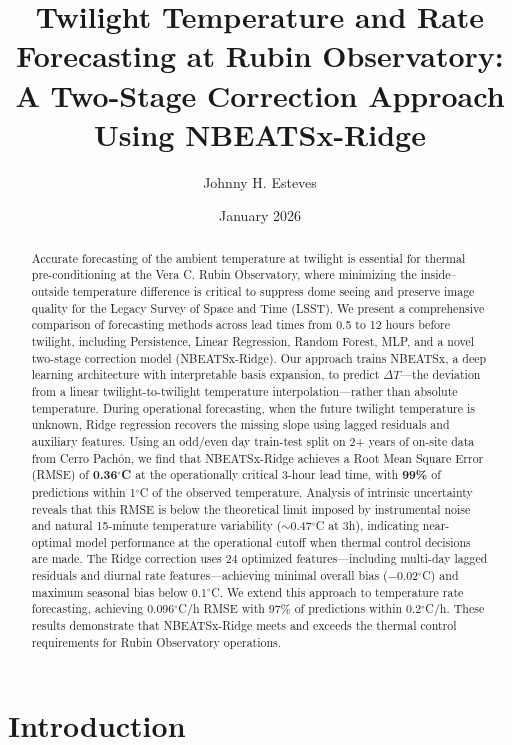 \documentclass[11pt]{article}
\title{Twilight Temperature and Rate Forecasting at Rubin Observatory:\\
A Two-Stage Correction Approach Using NBEATSx-Ridge}
\author{Johnny H. Esteves}
\date{January 2026}
\begin{document}
\maketitle

\begin{abstract}
Accurate forecasting of the ambient temperature at twilight is essential for thermal pre-conditioning at the Vera C. Rubin Observatory, where minimizing the inside--outside temperature difference is critical to suppress dome seeing and preserve image quality for the Legacy Survey of Space and Time (LSST). 
We present a comprehensive comparison of forecasting methods across lead times from 0.5 to 12 hours before twilight, including Persistence, Linear Regression, Random Forest, MLP, and a novel two-stage correction model (NBEATSx-Ridge). 
Our approach trains NBEATSx, a deep learning architecture with interpretable basis expansion, to predict $\Delta T$---the deviation from a linear twilight-to-twilight temperature interpolation---rather than absolute temperature. 
During operational forecasting, when the future twilight temperature is unknown, Ridge regression recovers the missing slope using lagged residuals and auxiliary features. Using an odd/even day train-test split on 2+ years of on-site data from Cerro Pach\'on, we find that NBEATSx-Ridge achieves a Root Mean Square Error (RMSE) of \textbf{0.36$^\circ$C} at the operationally critical 3-hour lead time, with \textbf{99\%} of predictions within 1$^\circ$C of the observed temperature. 
Analysis of intrinsic uncertainty reveals that this RMSE is below the theoretical limit imposed by instrumental noise and natural 15-minute temperature variability ($\sim$0.47$^\circ$C at 3h), indicating near-optimal model performance at the operational cutoff when thermal control decisions are made. 
The Ridge correction uses 24 optimized features---including multi-day lagged residuals and diurnal rate features---achieving minimal overall bias ($-$0.02$^\circ$C) and maximum seasonal bias below 0.1$^\circ$C. 
We extend this approach to temperature rate forecasting, achieving 0.096$^\circ$C/h RMSE with 97\% of predictions within 0.2$^\circ$C/h. 
These results demonstrate that NBEATSx-Ridge meets and exceeds the thermal control requirements for Rubin Observatory operations.
\end{abstract}

\section{Introduction}
\end{document}
